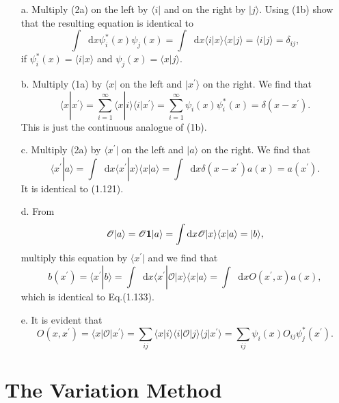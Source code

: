 \documentclass[a4paper]{book}
\newcounter{solution}[chapter]
\newcommand*{\dif}{\mathop{}\!\mathrm{d}}
\newcommand{\I}{{\bf 1}}
\begin{document}
	\begin{solution}
	
	\begin{itemize}
	
	\item[a.] Multiply (2a) on the left by $\langle i |$ and on the right by $| j \rangle$. Using (1b) show that the resulting equation is identical to 	
	\[
		\int \dif x \psi^*_i(x) \psi_j(x) = \int \dif x \langle i | x \rangle \langle x | j \rangle = \langle i | j \rangle = \delta_{ij} ,
	\]
	if $\psi^*_i(x) = \langle i | x \rangle$ and $\psi_j(x) = \langle x | j \rangle$.
	
	\item[b.] Multiply (1a) by $\langle x |$ on the left and $| x^\prime \rangle$ on the right. We find that
	\begin{equation*}
		\langle x | x^\prime \rangle = \sum_{i=1}^\infty \langle x | i \rangle \langle i | x^\prime \rangle = \sum_{i=1}^\infty \psi_i(x) \psi^*_i(x) = \delta( x - x^\prime ) .
	\end{equation*}
	This is just the continuous analogue of (1b).
	
	\item[c.] Multiply (2a) by $\langle x^\prime |$ on the left and $| a \rangle$ on the right. We find that
	\[
		\langle x^\prime | a \rangle = \int \dif x \langle x^\prime | x \rangle \langle x | a \rangle = \int \dif x \delta(  x - x^\prime ) a(x) = a( x^\prime ).
	\]
	It is identical to (1.121).
	
	\item[d.] From
	\[
		\mathscr{O} | a \rangle = \mathscr{O} \I | a \rangle = \int \dif x \mathscr{O} | x \rangle \langle x | a \rangle = | b \rangle ,
	\]
	multiply this equation by $\langle x^\prime |$ and we find that
	\[
		b( x^\prime ) = \langle x^\prime | b \rangle = \int \dif x \langle x^\prime | \mathscr{O} | x \rangle \langle x | a \rangle = \int \dif x O( x^\prime , x ) a(x) ,
	\]
	which is identical to Eq.(1.133).
	
	\item[e.] It is evident that
	\[
		O(x,x^\prime) = \langle x | \mathscr{O} | x^\prime \rangle = \sum_{ij} \langle x | i \rangle \langle i | \mathscr{O} | j \rangle \langle j | x^\prime \rangle  = \sum_{ij} \psi_i(x) O_{ij} \psi^*_j(x^\prime).
	\]	
	
	\end{itemize}		
	
	\end{solution}
	
	\section{The Variation Method}
	
\end{document}
